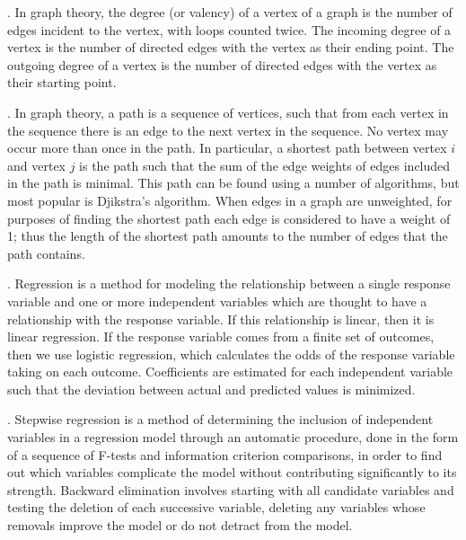 \documentclass[oneside,12pt]{report}
\begin{document}
\vspace{8pt} . In graph theory, the degree (or valency) of a vertex of a graph is the number of edges incident to the vertex, with loops counted twice. The incoming degree of a vertex is the number of directed edges with the vertex as their ending point. The outgoing degree of a vertex is the number of directed edges with the vertex as their starting point.

\vspace{8pt} . In graph theory, a path is a sequence of vertices, such that from each vertex in the sequence there is an edge to the next vertex in the sequence. No vertex may occur more than once in the path. In particular, a shortest path between vertex $i$ and vertex $j$ is the path such that the sum of the edge weights of edges included in the path is minimal. This path can be found using a number of algorithms, but most popular is Djikstra's algorithm. When edges in a graph are unweighted, for purposes of finding the shortest path each edge is considered to have a weight of 1; thus the length of the shortest path amounts to the number of edges that the path contains.

\vspace{8pt} . Regression is a method for modeling the relationship between a single response variable and one or more independent variables which are thought to have a relationship with the response variable. If this relationship is linear, then it is linear regression. If the response variable comes from a finite set of outcomes, then we use logistic regression, which calculates the odds of the response variable taking on each outcome. Coefficients are estimated for each independent variable such that the deviation between actual and predicted values is minimized.

\vspace{8pt} . Stepwise regression is a method of determining the inclusion of independent variables in a regression model through an automatic procedure, done in the form of a sequence of F-tests and information criterion comparisons, in order to find out which variables complicate the model without contributing significantly to its strength. Backward elimination involves starting with all candidate variables and testing the deletion of each successive variable, deleting any variables whose removals improve the model or do not detract from the model.
\end{document}
